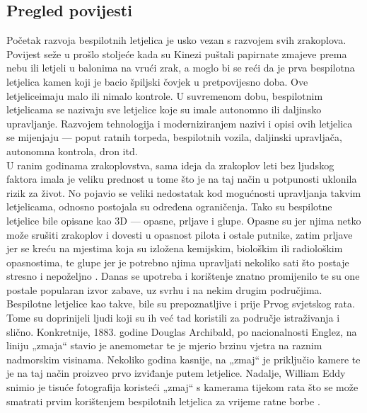 \documentclass[times, utf8, diplomski]{fer}
\begin{document}
\subsection{Pregled povijesti}
Početak razvoja bespilotnih letjelica je usko vezan s razvojem svih zrakoplova. Povijest seže u prošlo stoljeće kada su Kinezi puštali papirnate zmajeve prema nebu ili letjeli u balonima na vrući zrak, a moglo bi se reći da je prva bespilotna letjelica kamen koji je bacio špiljski čovjek u pretpovijesno doba. Ove \glqq letjelice\grqq imaju malo ili nimalo kontrole. U suvremenom dobu, bespilotnim letjelicama se nazivaju sve letjelice koje su imale autonomno ili daljinsko upravljanje. Razvojem tehnologija i moderniziranjem nazivi i opisi ovih letjelica se mijenjaju --- poput ratnih torpeda, bespilotnih vozila, daljinski upravljača, autonomna kontrola, dron itd.\\
U ranim godinama zrakoplovstva, sama ideja da zrakoplov leti bez ljudskog faktora imala je veliku prednost u tome što je na taj način u potpunosti uklonila rizik za život. No pojavio se veliki nedostatak kod mogućnosti upravljanja takvim letjelicama, odnosno postojala su određena ograničenja. Tako su bespilotne letjelice bile opisane kao 3D  --- opasne, prljave i glupe. Opasne su jer njima netko može srušiti zrakoplov i dovesti u opasnost pilota i ostale putnike, zatim prljave  jer se kreću na mjestima koja su izložena kemijskim, biološkim ili radiološkim opasnostima, te glupe jer je potrebno njima upravljati nekoliko sati što postaje stresno i nepoželjno \citep{unmannedAircraftSystem}. Danas se upotreba i korištenje znatno promijenilo te su one postale popularan izvor zabave, uz svrhu i na nekim drugim područjima.\\
Bespilotne letjelice kao takve, bile su prepoznatljive i prije Prvog svjetskog rata. Tome su  doprinijeli ljudi koji su ih već tad koristili za područje istraživanja i slično. Konkretnije, 1883.  godine  Douglas  Archibald, po  nacionalnosti Englez,  na liniju  „zmaja“  stavio  je anemometar  te  je  mjerio  brzinu  vjetra  na  raznim  nadmorskim  visinama. Nekoliko  godina kasnije, na „zmaj“ je priključio kamere te je na taj način proizveo prvo izviđanje putem letjelice. Nadalje, William Eddy snimio je tisuće fotografija koristeći „zmaj“ s kamerama tijekom rata što se može smatrati prvim korištenjem bespilotnih letjelica za vrijeme ratne borbe \citep{UAVSystems}.\\
\end{document}
